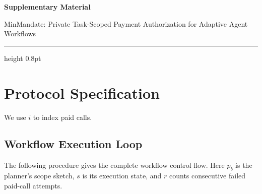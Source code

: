 \documentclass[letterpaper]{article}
\begin{document}
\newenvironment{MMAppendixTable}[1][tb]{%
  \ifdefined\MMAAAITwoColumn
    \begin{table}[t]
    \setlength{\columnwidth}{\textwidth}%
  \else
    \begin{table}[#1]
  \fi
}{%
  \ifdefined\MMAAAITwoColumn
    \end{table}
  \else
    \end{table}
  \fi
}
\ifdefined\MMAAAITwoColumn
\else
  \clearpage
  \thispagestyle{empty}
  \begin{center}
    {\sffamily\bfseries\LARGE Supplementary Material\par}
    \vspace{0.45em}
    {\large MinMandate: Private Task-Scoped Payment Authorization for Adaptive Agent Workflows\par}
  \end{center}
  \vspace{1.25em}
  {\color{MMAccent}\hrule height 0.8pt}
  \vspace{0.9em}
  \par
  \vspace{0.25em}
  \renewcommand{\contentsname}{}
  \begingroup
  \linespread{1.12}\selectfont
  \tableofcontents
  \endgroup
  \clearpage
\fi
\section{Protocol Specification}
\label{app:construction-details}

We use \(i\) to index paid calls.

\subsection{Workflow Execution Loop}
\label{app:execution-loop}

The following procedure gives the complete workflow control flow.  Here
\(p_b\) is the planner's scope sketch, \(s\) is its execution
state, and \(r\) counts consecutive failed paid-call attempts.
\end{document}

